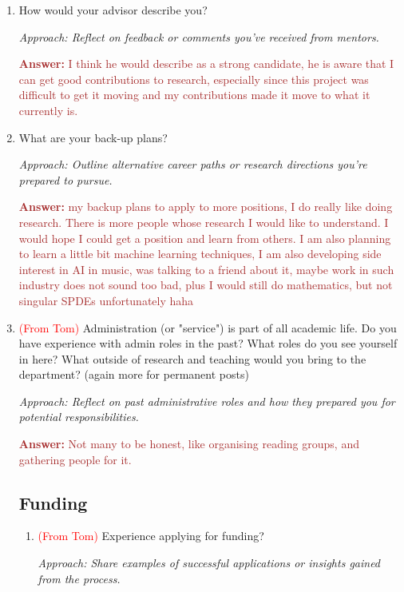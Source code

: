 \documentclass[12pt]{article}
\numberwithin{equation}{section}
\newcommand{\brown}[1]{\textcolor{brown}{#1}}
\newcommand{\red}[1]{\textcolor{red}{#1}}
\begin{document}
\begin{enumerate}
    \item How would your advisor describe you?
    
    \textit{Approach: Reflect on feedback or comments you’ve received from mentors.}

    \brown{\textbf{Answer:} I think he would describe as a strong candidate, he is aware that I can get good contributions to research, especially since this project was difficult to get it moving and my contributions made it move to what it currently is. }

    
    \item What are your back-up plans?
    
    \textit{Approach: Outline alternative career paths or research directions you’re prepared to pursue.}

    \brown{\textbf{Answer:} my backup plans to apply to more positions, I do really like doing research. There is more people whose research I would like to understand. I would hope I could get a position and learn from others. I am also planning to learn a little bit machine learning techniques, I am also developing side interest in AI in music, was talking to a friend about it, maybe work in such industry does not sound too bad, plus I would still do mathematics, but not singular SPDEs unfortunately haha}
    
     \item \red{(From Tom)} Administration (or "service") is part of all academic life. Do you have experience with admin roles in the past? What roles do you see yourself in here? What outside of research and teaching would you bring to the department? (again more for permanent posts)
    
    \textit{Approach: Reflect on past administrative roles and how they prepared you for potential responsibilities.}

    \brown{\textbf{Answer:} Not many to be honest, like organising reading groups, and gathering people for it.}
    \subsection{Funding}
\begin{enumerate}
    

    \item \red{(From Tom)} Experience applying for funding?
    
    \textit{Approach: Share examples of successful applications or insights gained from the process.}


\end{enumerate}
\end{enumerate}
\end{document}
